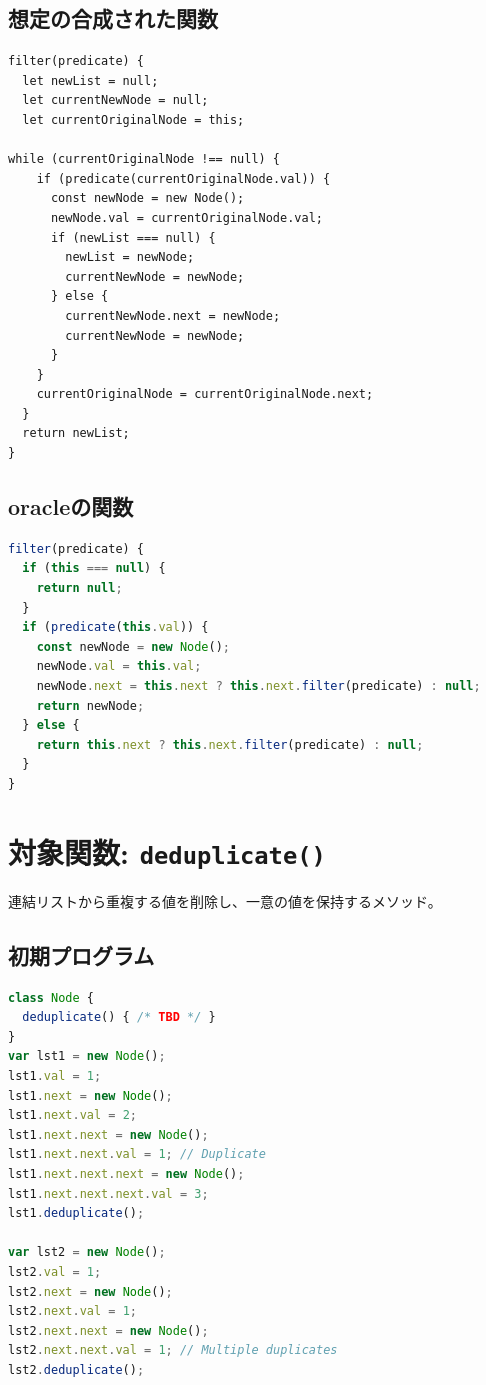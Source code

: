 \documentclass{article}
\begin{document}
\subsection{想定の合成された関数}
\begin{lstlisting}
filter(predicate) {
  let newList = null;
  let currentNewNode = null;
  let currentOriginalNode = this;

while (currentOriginalNode !== null) {
    if (predicate(currentOriginalNode.val)) {
      const newNode = new Node();
      newNode.val = currentOriginalNode.val;
      if (newList === null) {
        newList = newNode;
        currentNewNode = newNode;
      } else {
        currentNewNode.next = newNode;
        currentNewNode = newNode;
      }
    }
    currentOriginalNode = currentOriginalNode.next;
  }
  return newList;
}
\end{lstlisting}

\subsection{oracleの関数}
\begin{lstlisting}[language=JavaScript]
filter(predicate) {
  if (this === null) {
    return null;
  }
  if (predicate(this.val)) {
    const newNode = new Node();
    newNode.val = this.val;
    newNode.next = this.next ? this.next.filter(predicate) : null;
    return newNode;
  } else {
    return this.next ? this.next.filter(predicate) : null;
  }
}
\end{lstlisting}


\section{対象関数: \texttt{deduplicate()}}
連結リストから重複する値を削除し、一意の値を保持するメソッド。

\subsection{初期プログラム}

\begin{lstlisting}[language=JavaScript]
class Node {
  deduplicate() { /* TBD */ }
}
var lst1 = new Node(); 
lst1.val = 1;
lst1.next = new Node();
lst1.next.val = 2;
lst1.next.next = new Node();
lst1.next.next.val = 1; // Duplicate
lst1.next.next.next = new Node();
lst1.next.next.next.val = 3;
lst1.deduplicate();

var lst2 = new Node();
lst2.val = 1;
lst2.next = new Node();
lst2.next.val = 1;
lst2.next.next = new Node();
lst2.next.next.val = 1; // Multiple duplicates
lst2.deduplicate();
\end{lstlisting}
\end{document}
